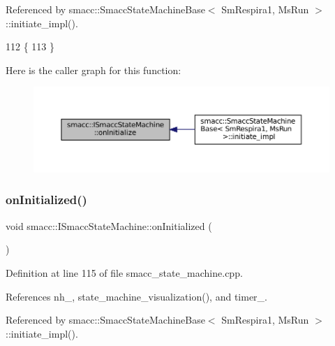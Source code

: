 Referenced by smacc\+::\+Smacc\+State\+Machine\+Base$<$ Sm\+Respira1, Ms\+Run $>$\+::initiate\+\_\+impl().


\begin{DoxyCode}
112 \{
113 \}
\end{DoxyCode}
Here is the caller graph for this function\+:
\nopagebreak
\begin{figure}[H]
\begin{center}
\leavevmode
\includegraphics[width=350pt]{classsmacc_1_1ISmaccStateMachine_ac2982c6c8283663e5e1e8a7c82f511ec_icgraph}
\end{center}
\end{figure}
\mbox{\label{classsmacc_1_1ISmaccStateMachine_a95e7f71d0d88fffd0afebb1f9ccdade5}} 
\subsubsection{\texorpdfstring{on\+Initialized()}{onInitialized()}}
{\footnotesize\ttfamily void smacc\+::\+I\+Smacc\+State\+Machine\+::on\+Initialized (\begin{DoxyParamCaption}{ }\end{DoxyParamCaption})\hspace{0.3cm}{\ttfamily [protected]}}



Definition at line 115 of file smacc\+\_\+state\+\_\+machine.\+cpp.



References nh\+\_\+, state\+\_\+machine\+\_\+visualization(), and timer\+\_\+.



Referenced by smacc\+::\+Smacc\+State\+Machine\+Base$<$ Sm\+Respira1, Ms\+Run $>$\+::initiate\+\_\+impl().


